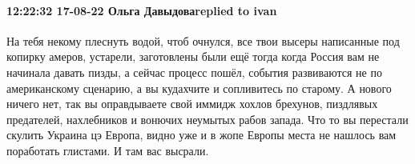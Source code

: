  
 
 
 
 

\paragraph{12:22:32 17-08-22 Ольга Давыдоваreplied to ivan}

На тебя некому плеснуть водой, чтоб очнулся, все твои высеры написанные под
копирку амеров, устарели, заготовлены были ещё тогда когда Россия вам не
начинала давать пизды, а сейчас процесс пошёл, события развиваются не по
американскому сценарию, а вы кудахчите и сопливитесь по старому. А нового
ничего нет, так вы оправдываете свой иммидж хохлов брехунов, пиздлявых
предателей, нахлебников и вонючих неумытых рабов запада. Что то вы перестали
скулить Украина цэ Европа, видно уже и в жопе Европы места не нашлось вам
поработать глистами. И там вас высрали.
